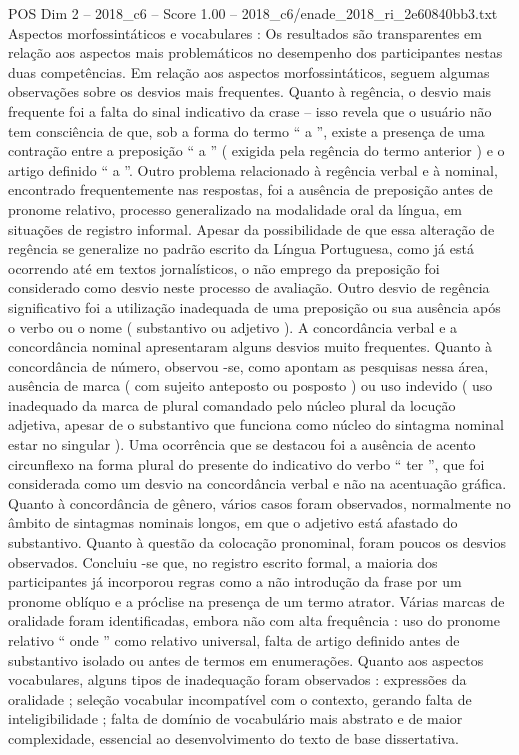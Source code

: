 \begin{textsample}{POS Dim 2 – 2018\_c6 – Score 1.00 – 2018\_c6/enade\_2018\_ri\_2e60840bb3.txt}
Aspectos morfossintáticos e vocabulares : Os resultados são transparentes em relação aos aspectos mais problemáticos no desempenho dos participantes nestas duas competências.
Em relação aos aspectos morfossintáticos, seguem algumas observações sobre os desvios mais frequentes.
Quanto à regência, o desvio mais frequente foi a falta do sinal indicativo da crase – isso revela que o usuário não tem consciência de que, sob a forma do termo “ a ”, existe a presença de uma contração entre a preposição “ a ” ( exigida pela regência do termo anterior ) e o artigo definido “ a ”.
Outro problema relacionado à regência verbal e à nominal, encontrado frequentemente nas respostas, foi a ausência de preposição antes de pronome relativo, processo generalizado na modalidade oral da língua, em situações de registro informal.
Apesar da possibilidade de que essa alteração de regência se generalize no padrão escrito da Língua Portuguesa, como já está ocorrendo até em textos jornalísticos, o não emprego da preposição foi considerado como desvio neste processo de avaliação.
Outro desvio de regência significativo foi a utilização inadequada de uma preposição ou sua ausência após o verbo ou o nome ( substantivo ou adjetivo ).
A concordância verbal e a concordância nominal apresentaram alguns desvios muito frequentes.
Quanto à concordância de número, observou -se, como apontam as pesquisas nessa área, ausência de marca ( com sujeito anteposto ou posposto ) ou uso indevido ( uso inadequado da marca de plural comandado pelo núcleo plural da locução adjetiva, apesar de o substantivo que funciona como núcleo do sintagma nominal estar no singular ).
Uma ocorrência que se destacou foi a ausência de acento circunflexo na forma plural do presente do indicativo do verbo “ ter ”, que foi considerada como um desvio na concordância verbal e não na acentuação gráfica.
Quanto à concordância de gênero, vários casos foram observados, normalmente no âmbito de sintagmas nominais longos, em que o adjetivo está afastado do substantivo.
Quanto à questão da colocação pronominal, foram poucos os desvios observados.
Concluiu -se que, no registro escrito formal, a maioria dos participantes já incorporou regras como a não introdução da frase por um pronome oblíquo e a próclise na presença de um termo atrator.
Várias marcas de oralidade foram identificadas, embora não com alta frequência : uso do pronome relativo “ onde ” como relativo universal, falta de artigo definido antes de substantivo isolado ou antes de termos em enumerações.
Quanto aos aspectos vocabulares, alguns tipos de inadequação foram observados : expressões da oralidade ; seleção vocabular incompatível com o contexto, gerando falta de inteligibilidade ; falta de domínio de vocabulário mais abstrato e de maior complexidade, essencial ao desenvolvimento do texto de base dissertativa.

\end{textsample}
